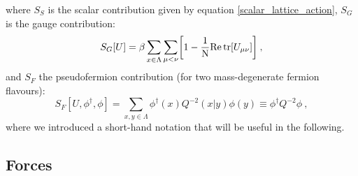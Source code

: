 %
where $S_S$ is the scalar contribution given by equation \ref{scalar_lattice_action}, $S_G$ is the gauge contribution:
\begin{equation}
S_G[U] =  \beta \sum_{x \in \Lambda}  \sum_{\mu < \nu} \biggr[  1 - \frac{1}{\mathrm{N}} \mathrm{Re} \tr  [U_{\mu \nu}] \biggl ] \: ,
\end{equation}
%
and $S_F$ the pseudofermion contribution (for two mass-degenerate fermion flavours):
\begin{equation}
S_F[U,\phi^{\dagger},\phi]  = \sum_{x,y \in \Lambda} \phi^{\dagger}(x) Q^{-2}(x \vert y)\phi(y) \equiv \phi^{\dagger} Q^{-2} \phi \: ,
\end{equation}
%
where we introduced a short-hand notation that will be useful in the following.


\subsection{Forces}
\label{Forces}


